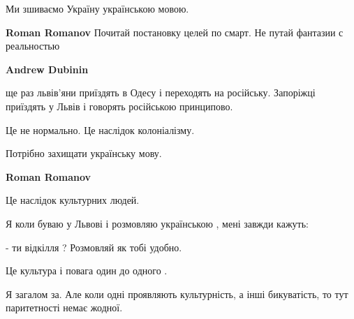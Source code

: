 \begin{itemize}
\begin{itemize}
Ми зшиваємо Україну українською мовою.

 
\textbf{Roman Romanov}
Почитай постановку целей по смарт.
Не путай фантазии с реальностью

 
\textbf{Andrew Dubinin} 

ще раз львів'яни приїздять в Одесу і переходять на російську. Запоріжці
приїздять у Львів і говорять російською принципово.

Це не нормально. Це наслідок колоніалізму.

Потрібно захищати українську мову.

 
\textbf{Roman Romanov}

Це наслідок культурних людей.

Я коли буваю у Львові і розмовляю українською , мені завжди кажуть:

- ти відкілля ? Розмовляй як тобі удобно.

Це культура і повага один до одного .

 

Я загалом за. Але коли одні проявляють культурність, а інші бикуватість, то тут паритетності немає жодної.

 

\end{itemize}
\end{itemize}
